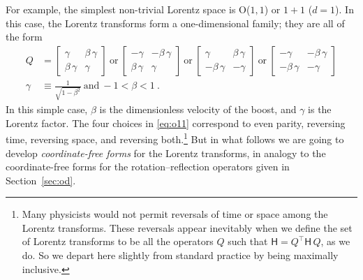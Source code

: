 \documentclass{article}
\newcommand{\metric}{\mathsf{H}}
\newcommand{\plus}{\!+\!} %
\newcommand{\secref}[1]{Section~\ref{#1}}
\begin{document}
For example, the simplest non-trivial Lorentz space is O($1,1$) or $1\plus1$ ($d=1$).
In this case, the Lorentz transforms form a one-dimensional family; they are all of the form
\begin{align}
    Q &= \begin{bmatrix}\gamma & \beta\,\gamma \\ \beta\,\gamma & \gamma\end{bmatrix} ~\mbox{or}~
    \begin{bmatrix}-\gamma & -\beta\,\gamma \\ \beta\,\gamma & \gamma\end{bmatrix} ~\mbox{or}~
    \begin{bmatrix}\gamma & \beta\,\gamma \\ -\beta\,\gamma & -\gamma\end{bmatrix}  ~\mbox{or}~
    \begin{bmatrix}-\gamma & -\beta\,\gamma \\ -\beta\,\gamma & -\gamma\end{bmatrix} \label{eq:o11}
    \\
    \gamma &\equiv \frac{1}{\sqrt{1 - \beta^2}} ~ \mbox{and} ~ -1 < \beta < 1 ~.\nonumber
\end{align}
In this simple case, $\beta$ is the dimensionless velocity of the boost, and $\gamma$ is the Lorentz factor.
The four choices in \eqref{eq:o11} correspond to even parity, reversing time, reversing space, and reversing both.\footnote{%
Many physicists would not permit reversals of time or space among the Lorentz transforms.
These reversals appear inevitably when we define the set of Lorentz transforms to be all the operators $Q$ such that $\metric=Q^\top\metric\,Q$, as we do.
So we depart here slightly from standard practice by being maximally inclusive.}
But in what follows we are going to develop \emph{coordinate-free forms} for the Lorentz transforms, in analogy to the coordinate-free forms for the rotation--reflection operators given in \secref{sec:od}.
\end{document}
